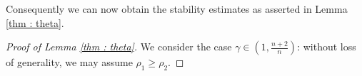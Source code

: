 \documentclass{amsart}
\theoremstyle{plain}
\theoremstyle{remark}
\numberwithin{equation}{section}
\newcommand{\R}{\mathbb{R}}
\newcommand{\dv}{\textnormal{d}v}
\newcommand{\lt}{\left}
\newcommand{\rt}{\right}
\begin{document}
Consequently we can now obtain the stability estimates as asserted in Lemma \ref{thm : theta}.


\begin{proof}[Proof of Lemma \ref{thm : theta}]
We consider the case $\gamma \in \lt(1,\frac{n+2}{n}\rt)$: without loss of generality, we may assume $\rho_1 \ge \rho_2$.


\end{proof}
\end{document}
